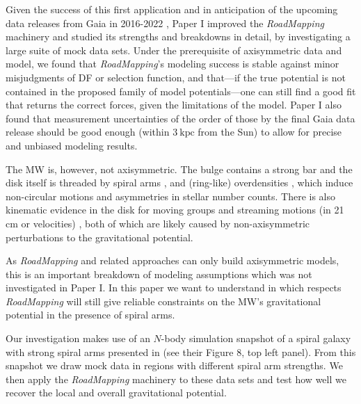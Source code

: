 \documentclass[iop,revtex4,numberedappendix,appendixfloats]{emulateapj}
\newcommand{\RM}{{\sl RoadMapping}}
\begin{document}
Given the success of this first application and in anticipation of the upcoming data releases from Gaia in 2016-2022 \citep{2013CEAB...37..115E}, Paper I improved the \RM{} machinery and studied its strengths and breakdowns in detail, by investigating a large suite of mock data sets. Under the prerequisite of axisymmetric data and model, we found that \RM{}'s modeling success is stable against minor misjudgments of DF or selection function, and that---if the true potential is not contained in the proposed family of model potentials---one can still find a good fit that returns the correct forces, given the limitations of the model. Paper I also found that measurement uncertainties of the order of those by the final Gaia data release should be good enough (within $3~\text{kpc}$ from the Sun) to allow for precise and unbiased modeling results. 

The MW is, however, not axisymmetric. The bulge contains a strong bar \citep{1980ApJ...236..779L,1991ApJ...379..631B,1991MNRAS.252..210B,1997MNRAS.288..365B,2000MNRAS.317L..45H,2013MNRAS.435.1874W} and the disk itself is threaded by spiral arms \citep{1958MNRAS.118..379O,1976A&A....49...57G,2009PASP..121..213C,2014ApJ...783..130R}, and (ring-like) overdensities \citep{2002ApJ...569..245N,2008ApJ...673..864J,2015ApJ...801..105X}, which induce non-circular motions and asymmetries in stellar number counts. There is also kinematic evidence in the disk for moving groups \citep{1998AJ....115.2384D,2005A&A...430..165F,2009ApJ...700.1794B,2010ApJ...717..617B} and streaming motions (in 21 cm or velocities) \citep{2015ApJ...800...83B,2013MNRAS.436..101W,2012MNRAS.425.2335S}, both of which are likely caused by non-axisymmetric perturbations to the gravitational potential.

As \RM{} and related approaches can only build axisymmetric models, this is an important breakdown of modeling assumptions which was not investigated in Paper I. In this paper we want to understand in which respects \RM{} will still give reliable constraints on the MW's gravitational potential in the presence of spiral arms.

Our investigation makes use of an $N$-body simulation snapshot of a spiral galaxy with strong spiral arms presented in \citet{2013ApJ...766...34D} (see their Figure 8, top left panel). From this snapshot we draw mock data in regions with different spiral arm strengths. We then apply the \RM{} machinery to these data sets and test how well we recover the local and overall gravitational potential.
\end{document}
